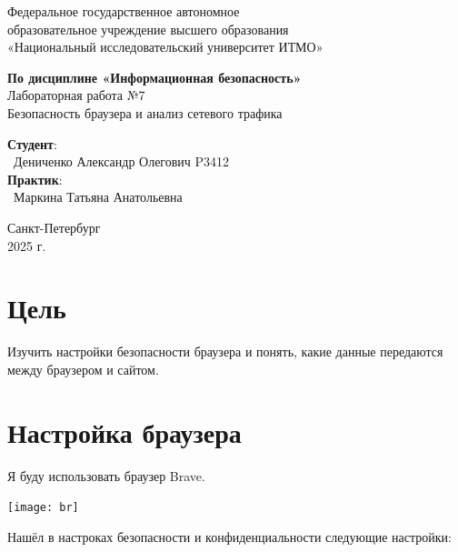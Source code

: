 \documentclass{article}
\begin{document}
\begin{center}
    \Large
    Федеральное государственное автономное \\
    образовательное учреждение высшего образования \\ 
    «Национальный исследовательский университет ИТМО»\\
    \vspace{0.5cm}
    \large
    
    \vspace{1cm}
    \Large
    \textbf{По дисциплине «Информационная безопасность»} \\
        Лабораторная работа №7\\
        Безопасность браузера и анализ сетевого
трафика
    \large
    \vspace{8cm}

    \begin{minipage}{.33\textwidth}
    \end{minipage}
    \hfill
    \begin{minipage}{.4\textwidth}
    
        \textbf{Студент}: \vspace{.1cm} \\
        \ Дениченко Александр Олегович P3412\\
        \textbf{Практик}:  \\
        \ Маркина Татьяна Анатольевна
    \end{minipage}
    \vfill
Санкт-Петербург\\ 2025 г.
\end{center}
\pagestyle{empty}
\newpage
\pagestyle{plain}

\section*{Цель}
Изучить настройки безопасности браузера и понять, какие данные передаются между
браузером и сайтом.

\section{Настройка браузера}
Я буду использовать браузер Brave.
\begin{center}
  \texttt{[image: br]}
\end{center}

Нашёл в настроках безопасности и конфиденциальности следующие настройки:
\end{document}
